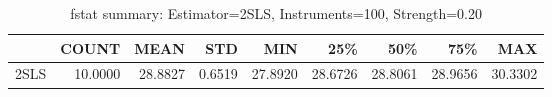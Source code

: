 \begin{table}[ht]
\centering
\caption{fstat summary: Estimator=2SLS, Instruments=100, Strength=0.20}
\begin{tabular}{lrrrrrrrr}
\toprule
 & COUNT & MEAN & STD & MIN & 25\% & 50\% & 75\% & MAX \\
\midrule
2SLS & 10.0000 & 28.8827 & 0.6519 & 27.8920 & 28.6726 & 28.8061 & 28.9656 & 30.3302 \\
\bottomrule
\end{tabular}
\end{table}
